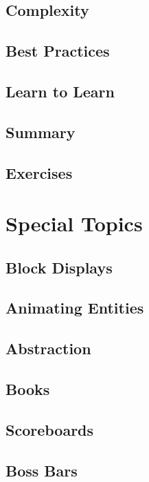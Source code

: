 \documentclass[oneside]{book}
\begin{document}
\section{Complexity}
\blindtext

\section{Best Practices}
\blindtext

\section{Learn to Learn}
\blindtext

\section{Summary}
\blindtext

\section{Exercises}
\blindtext

\chapter{Special Topics}
\blindtext

\section{Block Displays}
\blindtext

\section{Animating Entities}
\blindtext

\section{Abstraction}
\blindtext

\section{Books}
\blindtext

\section{Scoreboards}
\blindtext

\section{Boss Bars}
\blindtext
\end{document}
